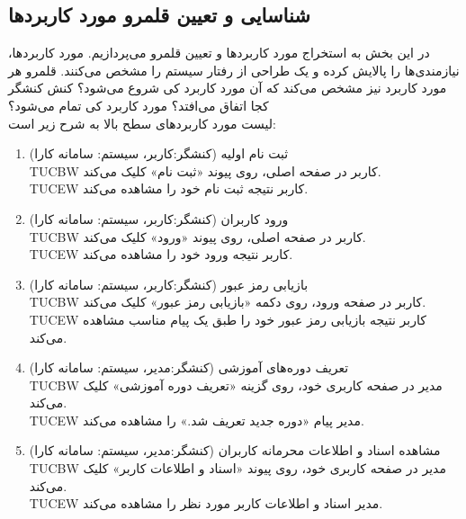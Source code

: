 \documentclass[12pt]{article}
\begin{document}
	\subsection{شناسایی و تعیین قلمرو مورد کاربردها}
	در این بخش به استخراج مورد کاربردها و تعیین قلمرو می‌پردازیم. مورد کاربردها، نیازمندی‌ها را پالایش کرده و یک طراحی از رفتار سیستم را مشخص می‌کنند. قلمرو هر مورد کاربرد نیز مشخص می‌کند که آن مورد کاربرد کی شروع می‌شود؟ کنش کنشگر کجا اتفاق می‌افتد؟ مورد کاربرد کی تمام می‌شود؟\\
	لیست مورد کاربردهای سطح بالا به شرح زیر است:
	\begin{enumerate}
		\item
		ثبت نام اولیه (کنشگر:‌کاربر، سیستم: سامانه کارا)\\
		TUCBW کاربر در صفحه اصلی، روی پیوند «ثبت نام» کلیک می‌کند.\\
		TUCEW کاربر نتیجه ثبت نام خود را مشاهده می‌کند.\\

		\item
		ورود کاربران (کنشگر:‌کاربر، سیستم: سامانه کارا)\\
		TUCBW کاربر در صفحه اصلی، روی پیوند «ورود» کلیک می‌کند. \\
		TUCEW کاربر نتیجه ورود خود را مشاهده می‌کند.\\

		\item
		بازیابی رمز عبور (کنشگر:‌کاربر، سیستم: سامانه کارا)\\
		TUCBW کاربر در صفحه ورود، روی دکمه «بازیابی رمز عبور» کلیک می‌کند.\\
		TUCEW کاربر نتیجه بازیابی رمز عبور خود را طبق یک پیام مناسب مشاهده می‌کند.\\

		\item
	تعریف دوره‌های آموزشی (کنشگر:‌مدیر، سیستم: سامانه کارا)\\
		TUCBW  مدیر در صفحه کاربری خود، روی گزینه «تعریف دوره آموزشی» کلیک می‌کند.\\
		TUCEW مدیر پیام «دوره جدید تعریف شد.» را مشاهده می‌کند.\\

		\item
		مشاهده اسناد و اطلاعات محرمانه کاربران (کنشگر:‌مدیر، سیستم: سامانه کارا)\\
		TUCBW مدیر در صفحه کاربری خود، روی پیوند «اسناد و اطلاعات کاربر» کلیک می‌کند.\\
		TUCEW مدیر اسناد و اطلاعات کاربر مورد نظر را مشاهده می‌کند.\\


\end{enumerate}
\end{document}
